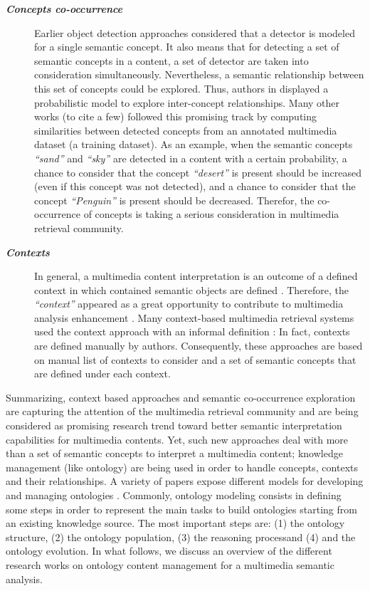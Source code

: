 	\begin{description}
		\item[\textit{\textbf{Concepts co-occurrence}}]
		Earlier object detection approaches considered that a detector is modeled for 
		a single semantic concept. It also means that for detecting a set of semantic concepts 
		in a content, a set of detector are taken into consideration simultaneously. Nevertheless,
		a semantic relationship between this set of concepts could be explored. Thus, authors in  
		\citep{Naphide2001} displayed a probabilistic model to explore inter-concept relationships. 
		Many other works \citep{Feng2012,Ksentini2012, Zheng2013} (to cite a few) followed this promising
		track by computing similarities between detected concepts from an annotated multimedia dataset 
		(a training dataset). As an example, when the semantic concepts \emph{``sand''} and 
		\emph{``sky''} are detected in a content with a certain probability, a chance to consider 
		that the concept \emph{``desert''} is present should be increased (even if this concept was
		not detected), and a chance to consider that the concept \emph{``Penguin''} is present 
		should be decreased. Therefor, the co-occurrence of concepts is taking a serious consideration 
		in multimedia retrieval community.

		\item[\textit{\textbf{Contexts}}]
		In general, a multimedia content interpretation is an outcome of a defined context in 
		which contained semantic objects are defined \citep{Dumitrescu2009}. Therefore, the 
		\emph{``context''} appeared as a great opportunity to contribute to multimedia analysis 
		enhancement \citep{Elgesem2007,Jiang2009,Fauzi2014}. Many context-based multimedia retrieval
		systems used the context approach with an informal definition 
		\citep{Cioara2009, Nguyen2010, Parsons2009,Elleuch2011,PerpetualCoutinho2012}: In fact,
		contexts are defined manually by authors. Consequently, these approaches are based on manual 
		list of contexts to consider and a set of semantic concepts that are defined under each context.
	\end{description}

	Summarizing, context based approaches and semantic co-occurrence exploration  are capturing the attention 
	of the multimedia retrieval community and are being considered as promising research trend toward better 
	semantic interpretation capabilities for multimedia contents. Yet, such new approaches deal with more than 
	a set of semantic concepts to interpret a multimedia content; knowledge management (like ontology) are being 
	used in order to handle concepts, contexts and their relationships. A variety of papers expose different models
	for developing and managing ontologies \citep{Fernandez-Lopez1999,Noy2001,Gargouri2010}. Commonly, 
	ontology modeling consists in defining some steps in order to represent the main tasks to build ontologies 
	starting from an existing knowledge source. The most important steps are: (1) the ontology structure, (2) 
	the ontology population, (3) the reasoning processand (4) and the ontology evolution. In what follows, 
	we discuss an overview of the different research works on ontology content management for a multimedia semantic analysis. 

